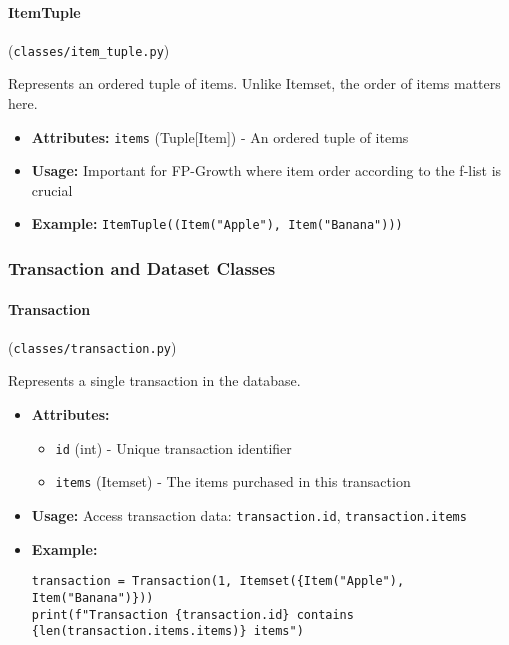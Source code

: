 \documentclass[
english,
smallborders
]{i6prcsht}
\begin{document}
\vspace*{0.3cm}

\paragraph{ItemTuple} (\texttt{classes/item\_tuple.py})

Represents an ordered tuple of items. Unlike Itemset, the order of items matters here.

\begin{itemize}
	\item \textbf{Attributes:} \texttt{items} (Tuple[Item]) - An ordered tuple of items
	\item \textbf{Usage:} Important for FP-Growth where item order according to the f-list is crucial
	\item \textbf{Example:} \texttt{ItemTuple((Item("Apple"), Item("Banana")))}
\end{itemize}

\vspace*{0.3cm}

\vspace*{0.5cm}

\subsubsection*{Transaction and Dataset Classes}

\paragraph{Transaction} (\texttt{classes/transaction.py})

Represents a single transaction in the database.

\begin{itemize}
	\item \textbf{Attributes:}
	      \begin{itemize}
		      \item \texttt{id} (int) - Unique transaction identifier
		      \item \texttt{items} (Itemset) - The items purchased in this transaction
	      \end{itemize}
	\item \textbf{Usage:} Access transaction data: \texttt{transaction.id}, \texttt{transaction.items}
	\item \textbf{Example:}
	      \begin{lstlisting}
transaction = Transaction(1, Itemset({Item("Apple"), Item("Banana")}))
print(f"Transaction {transaction.id} contains {len(transaction.items.items)} items")
    \end{lstlisting}
\end{itemize}
\end{document}

